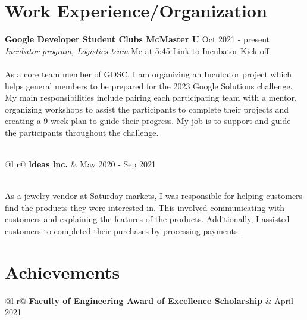 \documentclass[letterpaper,12pt]{article}
\begin{document}
\section{Work Experience/Organization}
\textbf{Google Developer Student Clubs McMaster U}  \hfill   Oct 2021 - present \\
\textit{Incubator program, Logistics team}
\hfill Me at 5:45 \hspace{0.2cm} \href{https://www.youtube.com/watch?v=gJmWtfJp0Yc&list=PL2WrPKDSKQY7176Ziea2CmELiduF3fVry&index=1}{Link to Incubator Kick-off} 
\\\\As a core team member of GDSC, I am organizing an Incubator project
which helps general members to be prepared for the 2023 Google
Solutions challenge. My main responsibilities include pairing each participating team with a mentor, organizing workshops to assist the participants to complete their projects and creating a 9-week plan to guide their progress. My job is to support and guide the participants throughout the challenge.
\\\\
\begin{tabularx}{\linewidth}{ @{}l r@{} }
\textbf{ldeas lnc.} &  \hfill \normalsize{May 2020 - Sep 2021} \\
\end{tabularx} \\

As a jewelry vendor at Saturday markets, I was responsible for helping customers find the products they were interested in. This involved communicating with customers and explaining the features of the products. Additionally, I assisted customers to completed their purchases by processing payments.

\section{Achievements}
\begin{tabularx}{\linewidth}{ @{}l r@{} }
\textbf{Faculty of Engineering Award of Excellence Scholarship} & \hfill April 2021 \\
\end{tabularx}
\end{document}
